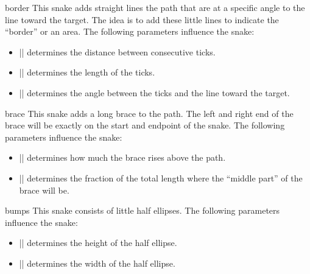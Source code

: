 \begin{snake}{border}
  This snake adds straight lines the path that are at a specific angle
  to the line toward the target. The idea is to add these little lines
  to indicate the ``border'' or an area. The following parameters
  influence the snake:  
  \begin{itemize}
  \item |\pgfsnakesegmentlength|
    determines the distance between consecutive ticks.
  \item |\pgfsnakesegmentamplitude|
    determines the length of the ticks.
  \item |\pgfsnakesegmentangle|
    determines the angle between the ticks and the line toward the
    target. 
  \end{itemize}
\begin{codeexample}[]
\end{codeexample}
\end{snake}


\begin{snake}{brace}
  This snake adds a long brace to the path. The left and right end of
  the brace will be exactly on the start and endpoint of the
  snake. The following parameters influence the snake:  
  \begin{itemize}
  \item |\pgfsnakesegmentamplitude|
    determines how much the brace rises above the path.
  \item |\pgfsnakesegmentaspect|
    determines the fraction of the total length where the ``middle
    part'' of the brace will be.  
  \end{itemize}
\begin{codeexample}[]
\end{codeexample}
\end{snake}

\begin{snake}{bumps}
  This snake consists of little half ellipses. The following parameters
  influence the snake:
  \begin{itemize}
  \item |\pgfsnakesegmentamplitude|
    determines the height of the half ellipse.
  \item |\pgfsnakesegmentlength|
    determines the width of the half ellipse.
  \end{itemize}
\begin{codeexample}[]
\end{codeexample}
\end{snake}


